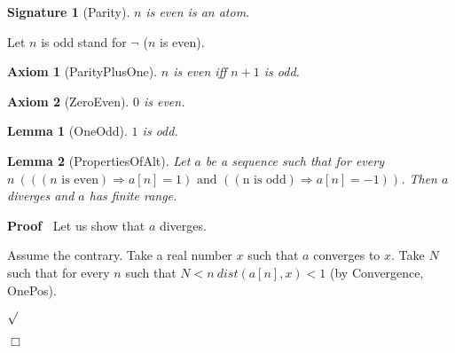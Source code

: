 \documentclass{article}
\newenvironment{forthel}{\begin{leftbar}}{\end{leftbar}}
\newenvironment{proof}{\noindent\textbf{Proof\ }}{\hspace*{\fill}$\Box$\medskip}
\newenvironment{subproof}{\begin{list}{}{}
		\item[\text{Proof}]}{\hfill $\surd$ \end{list}}
\newtheorem{axiom}{Axiom}
\newtheorem{lemma}{Lemma}
\newtheorem{signature}{Signature}
\begin{document}
\begin{forthel}
	\begin{signature}[Parity]
	$n$ is even is an atom.
	\end{signature}
	
	\noindent Let $n$ is odd stand for $\neg$ ($n$ is even).
	
	\begin{axiom}[ParityPlusOne]
	$n$ is even iff $n + 1$ is odd.
	\end{axiom}

	\begin{axiom}[ZeroEven]
	$0$ is even.
	\end{axiom}
	
	\begin{lemma}[OneOdd]
	$1$ is odd.
	\end{lemma} 
	
	\begin{lemma}[PropertiesOfAlt]
		Let $a$ be a sequence such that for every $n \ (((n \text{ is even}) \Rightarrow a[n] = 1) \text{ and } ((\text{n is odd}) \Rightarrow a[n] = -1))$.
		Then $a$ diverges and $a$ has finite range.
	\end{lemma}
	\begin{proof}
		Let us show that $a$ diverges.
		\begin{subproof}
			Assume the contrary.
			Take a real number $x$ such that $a$ converges to $x$.
			Take $N$ such that for every $n$ such that $N < n \ dist(a[n],x) < 1$ (by Convergence, OnePos).
			

\end{subproof}
\end{proof}
\end{forthel}
\end{document}
